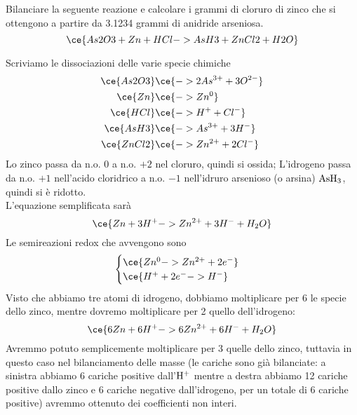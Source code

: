 \newpage

\begin{esercizio}
    Bilanciare la seguente reazione e calcolare i grammi di cloruro di zinco che si ottengono a partire da 3.1234 grammi di anidride arseniosa.
    \begin{equation*}
        \ce{As2O3 + Zn + HCl -> AsH3 + ZnCl2 + H2O}
    \end{equation*}
\end{esercizio}
\begin{soluzione}
    Scriviamo le dissociazioni delle varie specie chimiche
    \begin{equation*}
        \begin{split}
            \ce{As2O3} & \ce{-> 2As^{3+} + 3O^{2-}}
            \\
            \ce{Zn} & \ce{-> Zn^0}
            \\
            \ce{HCl} & \ce{-> H^+ + Cl^-}
            \\
            \ce{AsH3} & \ce{-> As^{3+} + 3H^-}
            \\
            \ce{ZnCl2} & \ce{-> Zn^{2+} + 2Cl^-}
        \end{split}
    \end{equation*}
    Lo zinco passa da n.o. $0$ a n.o. $+2$ nel cloruro, quindi si ossida; L'idrogeno passa da n.o. $+1$ nell'acido cloridrico a n.o. $-1$ nell'idruro arsenioso (o arsina) $\rm AsH_3$, quindi si è ridotto.\\
    L'equazione semplificata sarà
    \begin{equation*}
        \ce{Zn + 3H^+ -> Zn^{2+} + 3H^- + H_2O }
    \end{equation*}
    Le semireazioni redox che avvengono sono
    \begin{equation*}
        \begin{cases}
            \ce{Zn^{0} -> Zn^{2+} + 2e^-}\\
            \ce{H^+ + 2e^- -> H^-}
        \end{cases}
    \end{equation*}
    Visto che abbiamo tre atomi di idrogeno, dobbiamo moltiplicare per 6 le specie dello zinco, mentre dovremo moltiplicare per 2 quello dell'idrogeno:
    \begin{equation*}
        \ce{6Zn + 6H^+ -> 6Zn^{2+} + 6H^- + H_2O}
    \end{equation*}
    Avremmo potuto semplicemente moltiplicare per 3 quelle dello zinco, tuttavia in questo caso nel bilanciamento delle masse (le cariche sono già bilanciate: a sinistra abbiamo 6 cariche positive dall'$\rm H^+$ mentre a destra abbiamo 12 cariche positive dallo zinco e 6 cariche negative dall'idrogeno, per un totale di 6 cariche positive) avremmo ottenuto dei coefficienti non interi.\\

\end{soluzione}

